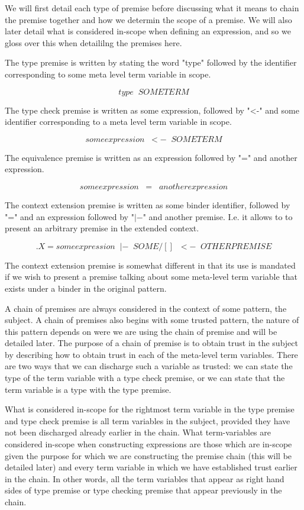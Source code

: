 We will first detail each type of premise before discussing what it
means to chain the premise together and how we determin the scope of a
premise. We will also later detail what is considered in-scope when
defining an expression, and so we gloss over this when detaililng the
premises here.

The type premise is written by stating the word "type" followed by
the identifier corresponding to some meta level term variable in
scope.

$$
type \;\; SOMETERM
$$

The type check premise is written as some expression, followed by "<-"
and some identifier corresponding to a meta level term variable in
scope.

$$
someexpression \;\;<-\;\; SOMETERM
$$

The equivalence premise is written as an expression followed by "="
and another expression.

$$
someexpression \;\;=\;\; anotherexpression
$$

The context extension premise is written as some binder identifier,
followed by "=" and an expression followed by "$|-$" and another
premise. I.e. it allows to to present an arbitrary premise in the
extended context.

$$
.X = someexpression \;\;|-\;\; SOME/[] \;\;<-\;\; OTHERPREMISE
$$

The context extension premise is somewhat different in that its use is
mandated if we wish to present a premise talking about some meta-level
term variable that exists under a binder in the original pattern.

A chain of premises are always considered in the context of some
pattern, the subject. A chain of premises also begins with some
trusted pattern, the nature of this pattern depends on were we are
using the chain of premise and will be detailed later. The purpose of
a chain of premise is to obtain trust in the subject by describing how
to obtain trust in each of the meta-level term variables. There are
two ways that we can discharge such a variable as trusted: we can
state the type of the term variable with a type check premise, or we
can state that the term variable is a type with the type premise.

What is considered in-scope for the rightmost term variable in the
type premise and type check premise is all term variables in the
subject, provided they have not been discharged already earlier in the
chain. What term-variables are considered in-scope when constructing
expressions are those which are in-scope given the purpose for which
we are constructing the premise chain (this will be detailed later)
and every term variable in which we have established trust earlier in
the chain. In other words, all the term variables that appear as right
hand sides of type premise or type checking premise that appear
previously in the chain.

